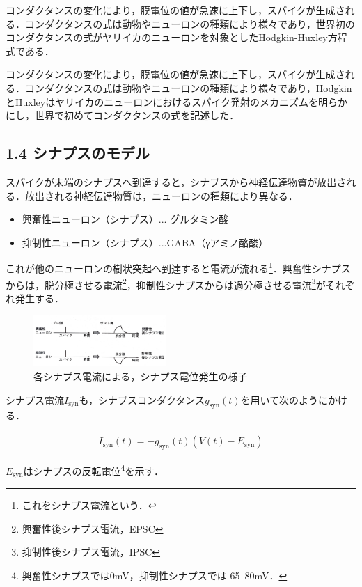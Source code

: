 \documentclass[dvipdfmx, A4j, twocolumn, 10.5pt]{jsarticle}
\begin{document}
コンダクタンスの変化により，膜電位の値が急速に上下し，スパイクが生成される．コンダクタンスの式は動物やニューロンの種類により様々であり，世界初のコンダクタンスの式がヤリイカのニューロンを対象としたHodgkin-Huxley方程式である．


コンダクタンスの変化により，膜電位の値が急速に上下し，スパイクが生成される．コンダクタンスの式は動物やニューロンの種類により様々であり，HodgkinとHuxleyはヤリイカのニューロンにおけるスパイク発射のメカニズムを明らかにし，世界で初めてコンダクタンスの式を記述した．

\subsection*{1.4 シナプスのモデル}
スパイクが末端のシナプスへ到達すると，シナプスから神経伝達物質が放出される．放出される神経伝達物質は，ニューロンの種類により異なる．
\begin{itemize}
 \item 興奮性ニューロン（シナプス）... グルタミン酸
 \item 抑制性ニューロン（シナプス）...GABA（γアミノ酪酸）
\end{itemize}


これが他のニューロンの樹状突起へ到達すると電流が流れる\footnote{これをシナプス電流という．}．興奮性シナプスからは，脱分極させる電流\footnote{興奮性後シナプス電流，EPSC}，抑制性シナプスからは過分極させる電流\footnote{抑制性後シナプス電流，IPSC}がそれぞれ発生する．

\begin{figure}[h]
 \centering
 \includegraphics[width=0.45\textwidth]{isyn.pdf}
 \caption{各シナプス電流による，シナプス電位発生の様子}
\end{figure}

シナプス電流$I_{\text{syn}}$も，シナプスコンダクタンス$g_{\text{syn}}(t)$を用いて次のようにかける．

\begin{align*}
 I_{\text{syn}}(t) = -g_{\text{syn}}(t) \left( V(t) - E_{\text{syn}} \right)
\end{align*}


$E_{\text{syn}}$はシナプスの反転電位\footnote{興奮性シナプスでは0mV，抑制性シナプスでは-65~80mV．}を示す．
\end{document}
